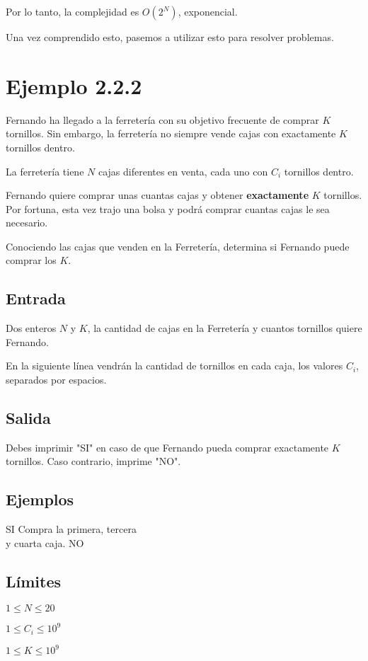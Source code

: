 Por lo tanto, la complejidad es \(O(2^N)\), exponencial.

Una vez comprendido esto, pasemos a utilizar esto para resolver problemas.
\section*{Ejemplo 2.2.2}

Fernando ha llegado a la ferretería con su objetivo frecuente de comprar \(K\) tornillos.  Sin embargo, la ferretería no siempre vende cajas con exactamente \(K\) tornillos dentro.

La ferretería tiene \(N\) cajas diferentes en venta, cada uno con \(C_i\) tornillos dentro.

Fernando quiere comprar unas cuantas cajas y obtener \textbf{exactamente} \(K\) tornillos. Por fortuna, esta vez trajo una bolsa y podrá comprar cuantas cajas le sea necesario.

Conociendo las cajas que venden en la Ferretería, determina si Fernando puede comprar los \(K\).

\subsection*{Entrada}
Dos enteros \(N\) y \(K\), la cantidad de cajas en la Ferretería y cuantos tornillos quiere Fernando.

En la siguiente línea vendrán la cantidad de tornillos en cada caja, los valores \(C_i\), separados por espacios.

\subsection*{Salida}
Debes imprimir "SI" en caso de que Fernando pueda comprar exactamente \(K\) tornillos. Caso contrario, imprime "NO".

\subsection*{Ejemplos}
\begin{casebox3}
	{SI}
	{
		Compra la primera, tercera\\
		y cuarta caja.
	}
	{NO}
	{}
\end{casebox3}
\subsection*{Límites}
\begin{plimits}
	\item \(1\leq N\leq 20 \)
	\item \(1\leq C_i\leq 10^9 \)
	\item \(1\leq K\leq 10^9 \)
\end{plimits}

